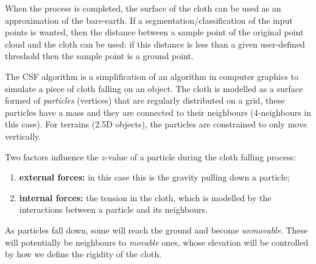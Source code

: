 %

When the process is completed, the surface of the cloth can be used as an approximation of the bare-earth.
If a segmentation/classification of the input points is wanted, then the distance between a sample point of the original point cloud and the cloth can be used: if this distance is less than a given user-defined threshold then the sample point is a ground point.

%

The CSF algorithm is a simplification of an algorithm in computer graphics to simulate a piece of cloth falling on an object.
The cloth is modelled as a surface formed of \emph{particles} (vertices) that are regularly distributed on a grid, these particles have a mass and they are connected to their neighbours (4-neighbours in this case).
For terrains (2.5D objects), the particles are constrained to only move vertically.

Two factors influence the $z$-value of a particle during the cloth falling process:
\begin{enumerate}
  \item \textbf{external forces:} in this case this is the gravity pulling down a particle;
  \item \textbf{internal forces:} the tension in the cloth, which is modelled by the interactions between a particle and its neighbours.
\end{enumerate}
As particles fall down, some will reach the ground and become \emph{unmovable}.
These will potentially be neighbours to \emph{movable} ones, whose elevation will be controlled by how we define the rigidity of the cloth.


